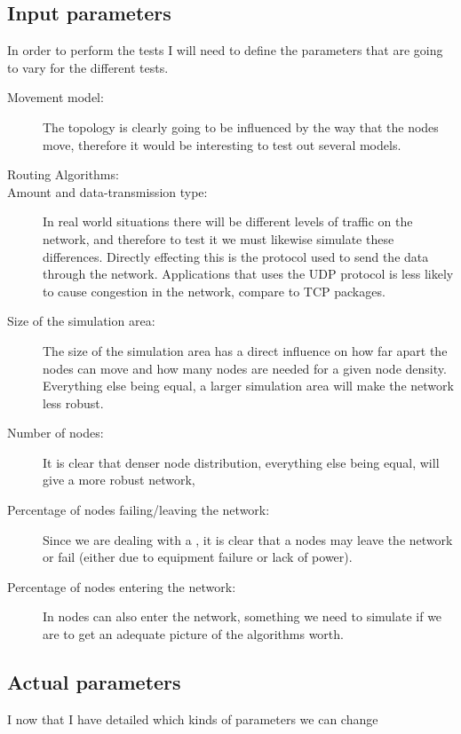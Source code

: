 \subsection{Input parameters}
In order to perform the tests I will need to define the parameters that are going to vary for the different tests.
\begin{description}
\item[Movement model:] The topology is clearly going to be influenced by the way that the nodes move, therefore it would be interesting to test out several models. 

\item[Routing Algorithms:] 

\item[Amount and data-transmission type:] In real world situations there will be different levels of traffic on the network, and therefore to test it we must likewise simulate these differences. Directly effecting this is the protocol used to send the data through the network. Applications that uses the UDP protocol is less likely to cause congestion in the network, compare to TCP packages.

\item[Size of the simulation area:] The size of the simulation area has a direct influence on how far apart the nodes can move and how many nodes are needed for a given node density. Everything else being equal, a larger simulation area will make the network less robust.

\item[Number of nodes:] It is clear that denser node distribution, everything else being equal, will give a more robust network,

\item[Percentage of nodes failing/leaving the network:] Since we are dealing with a \manet, it is clear that a nodes may leave the network or fail (either due to equipment failure or lack of power). 
\item[Percentage of nodes entering the network:] In \manet nodes can also enter the network, something we need to simulate if we are to get an adequate picture of the algorithms worth.
\end{description}


\subsection{Actual parameters}
I now that I have detailed which kinds of parameters we can change 

